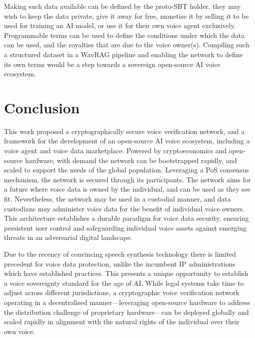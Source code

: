 \documentclass[11pt,a4paper]{article}
\begin{document}
Making such data available can be defined by the proto-SBT holder, they may wish to keep the data private, give it away for free, monetise it by selling it to be used for training an AI model, or use it for their own voice agent exclusively.
Programmable terms can be used to define the conditions under which the data can be used, and the royalties that are due to the voice owner(s).
Compiling such a structured dataset in a WavRAG pipeline and enabling the network to define its own terms would be a step towards a sovereign open-source AI voice ecosystem.

\section{Conclusion}
\label{sec:conclusion}
This work proposed a cryptographically secure voice verification network, and a framework for the development of an open-source AI voice ecosystem, including a voice agent and voice data marketplace.
Powered by cryptoeconomics and open-source hardware, with demand the network can be bootstrapped rapidly, and scaled to support the needs of the global population.
Leveraging a PoS consensus mechanism, the network is secured through its participants.
The network aims for a future where voice data is owned by the individual, and can be used as they see fit.
Nevertheless, the network may be used in a custodial manner, and data custodians may administer voice data for the benefit of individual voice owners.
This architecture establishes a durable paradigm for voice data security, ensuring persistent user control and safeguarding individual voice assets against emerging threats in an adversarial digital landscape.

Due to the recency of convincing speech synthesis technology there is limited precedent for voice data protection, unlike the incumbent IP administrations which have established practices. This presents a unique opportunity to establish a voice sovereignty standard for the age of AI.
While legal systems take time to adjust across different jurisdictions, a cryptographic voice verification network operating in a decentralised manner---leveraging open-source hardware to address the distribution challenge of proprietary hardware---can be deployed globally and scaled rapidly in alignment with the natural rights of the individual over their own voice.


\end{document}
